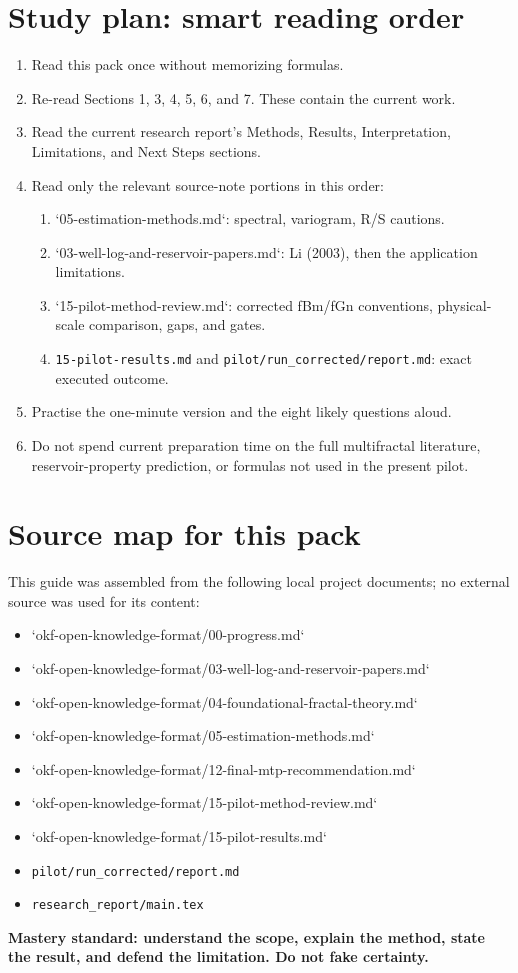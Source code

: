 \documentclass[11pt,a4paper]{article}
\begin{document}
\section{Study plan: smart reading order}
\begin{enumerate}
\item Read this pack once without memorizing formulas.
\item Re-read Sections 1, 3, 4, 5, 6, and 7. These contain the current work.
\item Read the current research report's Methods, Results, Interpretation, Limitations, and Next Steps sections.
\item Read only the relevant source-note portions in this order:
\begin{enumerate}
\item `05-estimation-methods.md`: spectral, variogram, R/S cautions.
\item `03-well-log-and-reservoir-papers.md`: Li (2003), then the application limitations.
\item `15-pilot-method-review.md`: corrected fBm/fGn conventions, physical-scale comparison, gaps, and gates.
\item \texttt{15-pilot-results.md} and \texttt{pilot/run\_corrected/report.md}: exact executed outcome.
\end{enumerate}
\item Practise the one-minute version and the eight likely questions aloud.
\item Do not spend current preparation time on the full multifractal literature, reservoir-property prediction, or formulas not used in the present pilot.
\end{enumerate}

\section{Source map for this pack}
This guide was assembled from the following local project documents; no external source was used for its content:
\begin{itemize}
\item `okf-open-knowledge-format/00-progress.md`
\item `okf-open-knowledge-format/03-well-log-and-reservoir-papers.md`
\item `okf-open-knowledge-format/04-foundational-fractal-theory.md`
\item `okf-open-knowledge-format/05-estimation-methods.md`
\item `okf-open-knowledge-format/12-final-mtp-recommendation.md`
\item `okf-open-knowledge-format/15-pilot-method-review.md`
\item `okf-open-knowledge-format/15-pilot-results.md`
\item \texttt{pilot/run\_corrected/report.md}
\item \texttt{research\_report/main.tex}
\end{itemize}

\vfill
\begin{center}
\color{Teal}\textbf{Mastery standard: understand the scope, explain the method, state the result, and defend the limitation. Do not fake certainty.}
\end{center}
\end{document}
